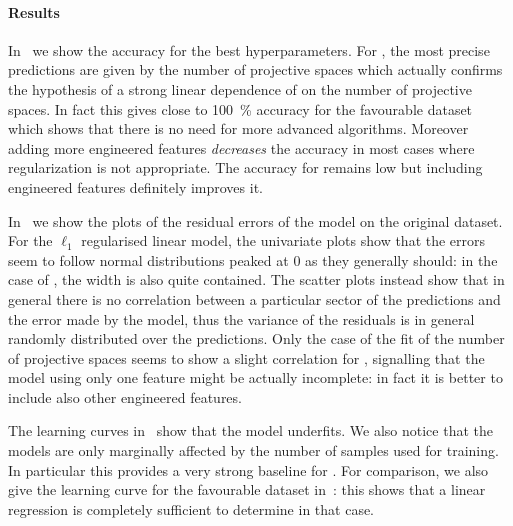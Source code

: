 \paragraph{Results}

In~ we show the accuracy for the best hyperparameters.
For , the most precise predictions are given by the number of projective spaces which actually confirms the hypothesis of a strong linear dependence of  on the number of projective spaces.
In fact this gives close to \SI{100}{\percent} accuracy for the favourable dataset which shows that there is no need for more advanced \ml algorithms.
Moreover adding more engineered features \emph{decreases} the accuracy in most cases where regularization is not appropriate.
The accuracy for  remains low but including engineered features definitely improves it.

In~ we show the plots of the residual errors of the model on the original dataset.
For the $\ell_1$ regularised linear model, the univariate plots show that the errors seem to follow normal distributions peaked at $0$ as they generally should: in the case of , the width is also quite contained.
The scatter plots instead show that in general there is no correlation between a particular sector of the predictions and the error made by the model, thus the variance of the residuals is in general randomly distributed over the predictions.
Only the case of the fit of the number of projective spaces seems to show a slight correlation for , signalling that the model using only one feature might be actually incomplete: in fact it is better to include also other engineered features.

The learning curves in~ show that the model underfits.
We also notice that the models are only marginally affected by the number of samples used for training.
In particular this provides a very strong baseline for .
For comparison, we also give the learning curve for the favourable dataset in~: this shows that a linear regression is completely sufficient to determine  in that case.

